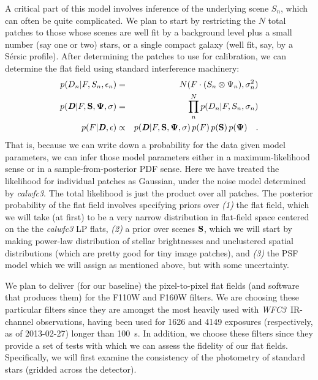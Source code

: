 \documentclass[12pt]{article}
\newcommand{\project}[1]{\textsl{#1}}
\newcommand{\WFC}{\project{WFC3}}
\newcommand{\bvec}[1]{\textbf{\textit{#1}}}
\begin{document}
A critical part of this model involves inference of the underlying
scene $S_n$, which can often be quite complicated.  We plan to start by restricting the $N$ total patches to those whose
scenes are well fit by a background level plus a small number (say one or two) stars, or a single compact
galaxy (well fit, say, by a S\'{e}rsic profile).  After determining
the patches to use for calibration, we can determine the flat field
using standard interference machinery:
\begin{eqnarray}
p(D_n|F,S_n,\epsilon_n) &=& N(F \cdot (S_n \otimes \Psi_n), \sigma_n^2)
\\
p(\bvec{D}|F,{\bf S},{\bf \Psi},{\bf \sigma}) &=& \prod_n^N
p(D_n|F,S_n,\sigma_n) \\
p(F|\bvec{D},{\bf \epsilon}) & \propto & p(\bvec{D}|F,{\bf S},{\bf \Psi},{\bf
  \sigma})\, p(F)\, p({\bf S})\, p({\bf \Psi})
\quad .
\end{eqnarray}
That is, because we can write down a probability for the data given model
parameters, we can infer those model parameters either in a maximum-likelihood
sense or in a sample-from-posterior PDF sense.
Here we have treated the likelihood for individual patches as
Gaussian, under the noise model determined by \textsl{calwfc3}.  The
total likelihood is just the product over all patches.  The posterior
probability of the flat field involves specifying priors over
\textsl{(1)} the flat field, which we will take (at first) to be a
very narrow distribution in flat-field space centered on the the
\textsl{calwfc3} LP flats, \textsl{(2)} a prior over scenes ${\bf S}$,
which we will start by making power-law distribution of stellar
brightnesses and unclustered spatial distributions (which are pretty
good for tiny image patches), and \textsl{(3)} the PSF model which we
will assign as mentioned above, but with some uncertainty.

We plan to deliver (for our baseline) the pixel-to-pixel flat fields
(and software that produces them) for the F110W and F160W filters.  We
are choosing these particular filters since they are amongst the most
heavily used with \WFC\ IR-channel observations, having been used for
1626 and 4149 exposures (respectively, as of 2013-02-27) longer than
100~s.  In addition, we choose these filters since they provide a set
of tests with which we can assess the fidelity of our flat fields.
Specifically, we will first examine the consistency of the photometry
of standard stars (gridded across the detector).
\end{document}
